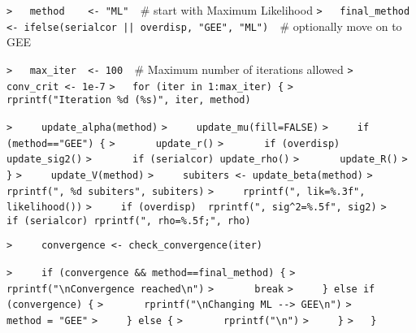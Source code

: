 \documentclass[a4paper]{article}
\begin{document}
\verb~>   method    <- "ML"  ~{\sffamily\# start with Maximum Likelihood}\newline
\verb~>   final_method <- ifelse(serialcor || overdisp, "GEE", "ML")  ~{\sffamily\# optionally move on to GEE}\par

\verb~>   max_iter  <- 100  ~{\sffamily\# Maximum number of iterations allowed}\newline
\verb~>   conv_crit <- 1e-7~\newline
\verb~>   for (iter in 1:max_iter) {~\newline
\verb~>     rprintf("Iteration %d (%s)", iter, method)~\par

\verb~>     update_alpha(method)~\newline
\verb~>     update_mu(fill=FALSE)~\newline
\verb~>     if (method=="GEE") {~\newline
\verb~>       update_r()~\newline
\verb~>       if (overdisp)  update_sig2()~\newline
\verb~>       if (serialcor) update_rho()~\newline
\verb~>       update_R()~\newline
\verb~>     }~\newline
\verb~>     update_V(method)~\newline
\verb~>     subiters <- update_beta(method)~\newline
\verb~>     rprintf(", %d subiters", subiters)~\newline
\verb~>     rprintf(", lik=%.3f", likelihood())~\newline
\verb~>     if (overdisp)  rprintf(", sig^2=%.5f", sig2)~\newline
\verb~>     if (serialcor) rprintf(", rho=%.5f;", rho)~\par

\verb~>     convergence <- check_convergence(iter)~\par

\verb~>     if (convergence && method==final_method) {~\newline
\verb~>       rprintf("\nConvergence reached\n")~\newline
\verb~>       break~\newline
\verb~>     } else if (convergence) {~\newline
\verb~>       rprintf("\nChanging ML --> GEE\n")~\newline
\verb~>       method = "GEE"~\newline
\verb~>     } else {~\newline
\verb~>       rprintf("\n")~\newline
\verb~>     }~\newline
\verb~>   }~\par
\end{document}

